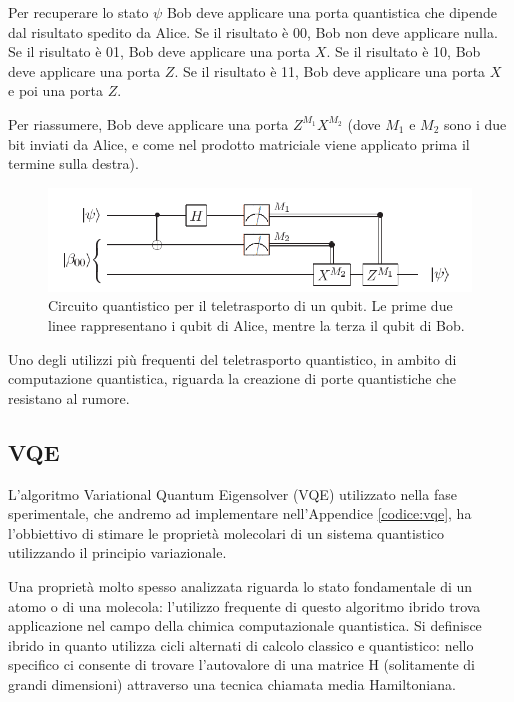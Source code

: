 Per recuperare lo stato $\psi$ Bob deve applicare una porta quantistica che dipende dal risultato spedito da Alice.
Se il risultato è 00, Bob non deve applicare nulla.
Se il risultato è 01, Bob deve applicare una porta $X$.
Se il risultato è 10, Bob deve applicare una porta $Z$.
Se il risultato è 11, Bob deve applicare una porta $X$ e poi una porta $Z$.

Per riassumere, Bob deve applicare una porta $Z^{M_1}X^{M_2}$ (dove $M_1$ e $M_2$ sono i due bit inviati da Alice, e come nel prodotto matriciale viene applicato prima il termine sulla destra).
\begin{figure}[htp]
    \centering
    \includegraphics[width=13cm]{Images/Capitolo2/teletrasporto_quantistico.png}
    \caption[Circuito quantistico per il teletrasporto di un qubit.]{Circuito quantistico per il teletrasporto di un qubit. Le prime due linee rappresentano i qubit di Alice, mentre la terza il qubit di Bob.}
    \label{fig:teletrasporto_quantistico}
\end{figure}

Uno degli utilizzi più frequenti del teletrasporto quantistico, in ambito di computazione quantistica, riguarda la creazione di porte quantistiche che resistano al rumore.

\subsection{VQE}
\label{subsec:vqe}
L'algoritmo Variational Quantum Eigensolver (VQE) utilizzato nella fase sperimentale, che andremo ad implementare nell'Appendice \ref{codice:vqe}, ha l'obbiettivo di stimare le proprietà molecolari di un sistema quantistico utilizzando il principio variazionale.

Una proprietà molto spesso analizzata riguarda lo stato fondamentale di un atomo o di una molecola: l'utilizzo frequente di questo algoritmo ibrido trova applicazione nel campo della chimica computazionale quantistica.
Si definisce ibrido in quanto utilizza cicli alternati di calcolo classico e quantistico: nello specifico ci consente di trovare l'autovalore di una matrice H (solitamente di grandi dimensioni) attraverso una tecnica chiamata media Hamiltoniana.


